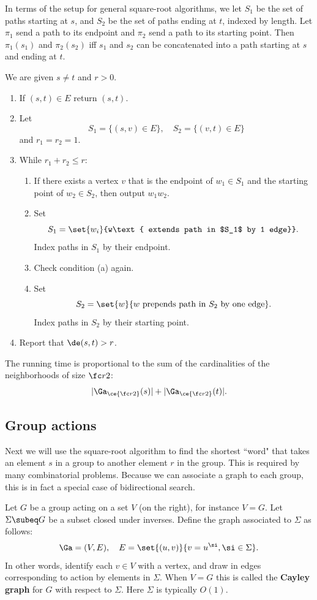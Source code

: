 In terms of the setup for general square-root algorithms, we let $S_1$ be the set of paths starting at $s$, and $S_2$ be the set of paths ending at $t$, indexed by length. Let $\pi_1$ send a path to its endpoint and $\pi_2$ send a path to its starting point. Then $\pi_1(s_1)$ and $\pi_2(s_2)$ iff $s_1$ and $s_2$ can be concatenated into a path starting at $s$ and ending at $t$.
\begin{alg}\label{alg:bid-s}
We are given $s\ne t$ and $r>0$.
\begin{enumerate}
\item If $(s,t)\in E$ return $(s,t)$.
\item Let 
\[S_1=\{(s,v)\in E\},\quad S_2=\{(v,t)\in E\}\]
and $r_1=r_2=1$.
\item 
While $r_1+r_2\le r$:
\begin{enumerate}
\item If there exists a vertex $v$ that is the endpoint of $w_1\in S_1$ and the starting point of $w_2\in S_2$, then output $w_1w_2$.
\item Set
\[S_1=\set{w_i}{w\text{ extends path in $S_1$ by 1 edge}}.\]
Index paths in $S_1$ by their endpoint.
\item Check condition (a) again.
\item Set
\[S_2=\set{w}{w\text{ prepends path in }S_2\text{ by one edge}}.\]
Index paths in $S_2$ by their starting point.
\end{enumerate}
\item Report that $\de(s,t)>r$.
\end{enumerate}
\end{alg}
The running time is proportional to the sum of the cardinalities of the neighborhoods of size $\fc r2$:
\[
|\Ga_{\ce{\fc r2}}(s) |+ |\Ga_{\ce{\fc r2}}(t)|.
\]
%
\subsection{Group actions}\label{sec:grp-act}
Next we will use the square-root algorithm to find the shortest ``word" that takes an element $s$ in a group to another element $r$ in the group. This is required by many combinatorial problems. Because we can associate a graph to each group, this is in fact a special case of bidirectional search. 

Let $G$ be a group acting on a set $V$ (on the right), for instance $V=G$. Let $\Sigma\subeq G$ be a subset closed under inverses. Define the graph associated to $\Sigma$ as follows:
\[
\Ga=(V,E),\quad E=\set{(u,v)}{v=u^{\si},\si\in \Sigma}.
\]
In other words, identify each $v\in V$ with a vertex, and draw in edges corresponding to action by elements in $\Sigma$. 
When $V=G$ this is called the \textbf{Cayley graph} for $G$ with respect to $\Sigma$. Here $\Sigma$ is typically $O(1)$. 

